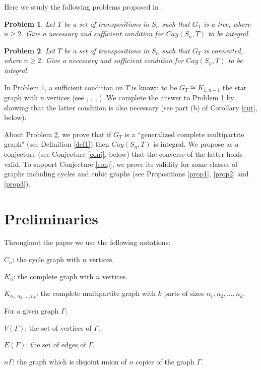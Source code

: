 \documentclass[12pt,a4paper]{article}
\newtheorem{prob}{\bf Problem}
\begin{document}
Here we study the following problems proposed in \cite{LZ}.

\begin{prob}{\rm \cite[Problem 5]{LZ}} \label{p5}
 Let $T$ be a set of transpositions in $S_n$ such that $G_T$ is a tree, where $n \geq 2$.
Give a necessary and sufficient condition for $Cay(S_n,T)$ to be integral.
\end{prob}
\begin{prob}{\rm \cite[Problem 6]{LZ}} \label{p6} Let $T$ be a set of transpositions in $S_n$ such that $G_T$ is connected, where $n \geq 2$.
Give a necessary and sufficient condition for $Cay(S_n,T)$ to be integral.
\end{prob}


In Problem \ref{p5}, a sufficient condition on $T$ is known to be $G_T\cong K_{1,n-1}$ the star graph with $n$ vertices (see \cite{AV}, \cite[Theorem 5.3]{C}, \cite{CF}, \cite{KM}).  We complete the answer to Problem \ref{p5} by showing that the latter condition is also necessary (see part (b) of Corollary \ref{cut}, below).

About Problem \ref{p6}, we prove that if $G_T$ is a ``generalized complete multipartite graph" (see Definition \ref{def1}) then $Cay(S_n,T)$ is integral. We propose as a conjecture (see Conjecture \ref{conj}, below) that the converse of the latter holds valid. To support Conjecture \ref{conj}, we prove its validity for some classes of graphs including cycles and cubic graphs (see Propositions \ref{prop1}, \ref{prop2} and \ref{prop3}).   

\section{Preliminaries}


Throughout the paper we use the following notations:

$C_n$: the cycle graph with $n$ vertices.

$K_n$: the complete graph with $n$ vertices.

$K_{n_1,n_2,\dots,n_k}$: the complete multipartite graph with $k$ parts of sizes $n_1,n_2,\dots,n_k$.

For a given graph $\Gamma$:

$V(\Gamma)$:  the set of vertices of $\Gamma$.

$E(\Gamma)$:  the set of edges of $\Gamma$. 

$n\Gamma$: the graph which is disjoint union of $n$ copies of the graph $\Gamma$.
\end{document}
